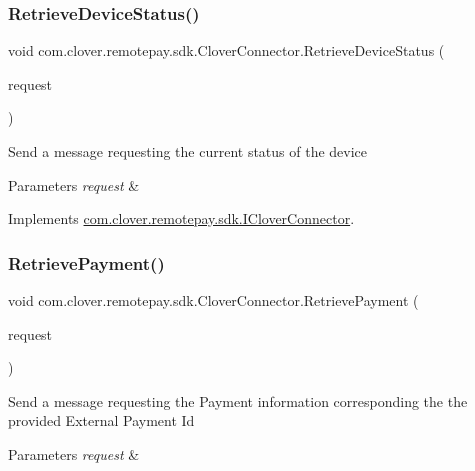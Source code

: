 \subsubsection{\texorpdfstring{Retrieve\+Device\+Status()}{RetrieveDeviceStatus()}}
{\footnotesize\ttfamily void com.\+clover.\+remotepay.\+sdk.\+Clover\+Connector.\+Retrieve\+Device\+Status (\begin{DoxyParamCaption}\item[{Retrieve\+Device\+Status\+Request}]{request }\end{DoxyParamCaption})}



Send a message requesting the current status of the device 


\begin{DoxyParams}{Parameters}
{\em request} & \\
\hline
\end{DoxyParams}


Implements \hyperlink{interfacecom_1_1clover_1_1remotepay_1_1sdk_1_1_i_clover_connector_a172b1a191a58f1f0e4dcc0a8dc7eae48}{com.\+clover.\+remotepay.\+sdk.\+I\+Clover\+Connector}.

\mbox{\label{classcom_1_1clover_1_1remotepay_1_1sdk_1_1_clover_connector_a786435c5849a2d8befd83173f70e05a7}} 
\subsubsection{\texorpdfstring{Retrieve\+Payment()}{RetrievePayment()}}
{\footnotesize\ttfamily void com.\+clover.\+remotepay.\+sdk.\+Clover\+Connector.\+Retrieve\+Payment (\begin{DoxyParamCaption}\item[{Retrieve\+Payment\+Request}]{request }\end{DoxyParamCaption})}



Send a message requesting the Payment information corresponding the the provided External Payment Id 


\begin{DoxyParams}{Parameters}
{\em request} & \\
\hline
\end{DoxyParams}


